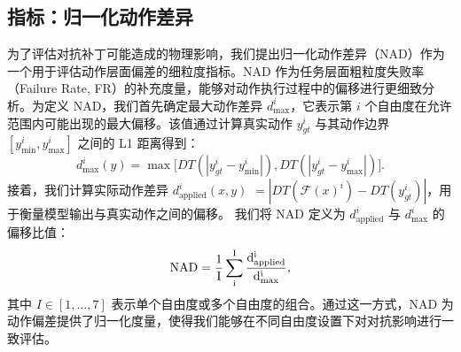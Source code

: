 \subsection{指标：归一化动作差异} \label{NAD_metric}
为了评估对抗补丁可能造成的物理影响，我们提出归一化动作差异（NAD）作为一个用于评估动作层面偏差的细粒度指标。NAD 作为任务层面粗粒度失败率（Failure Rate, FR）的补充度量，能够对动作执行过程中的偏移进行更细致分析。为定义 NAD，我们首先确定最大动作差异 $d^i_{\text{max}}$，它表示第 $i$ 个自由度在允许范围内可能出现的最大偏移。该值通过计算真实动作 $y^i_{gt}$ 与其动作边界 $[y^i_{\min},y^i_{\max}]$ 之间的 L1 距离得到：
\begin{equation}
    d_{\text{max}}^i (y) = \max \big[DT(| y^i_{gt} - y^i_{\min} |), DT(|y^i_{gt} - y^i_{\max} |)\big].
\end{equation}
接着，我们计算实际动作差异 $d_{\text{applied}}^i(x,y)$ $=|DT(\mathcal{F}(x)^i)-DT(y^i_{gt})|$，用于衡量模型输出与真实动作之间的偏移。
我们将 NAD 定义为 $d_{\text{applied}}^i$ 与 $d_{\text{max}}^i$ 的偏移比值：
\begin{equation}
    \rm{NAD} = \frac{1}{I}\sum_i^I \frac{d^i_{\text{applied}}}{d^i_{\text{max}}},
    \label{formula:AD}
\end{equation}
其中 $I\in[1,\dots,7]$ 表示单个自由度或多个自由度的组合。通过这一方式，NAD 为动作偏差提供了归一化度量，使得我们能够在不同自由度设置下对对抗影响进行一致评估。
